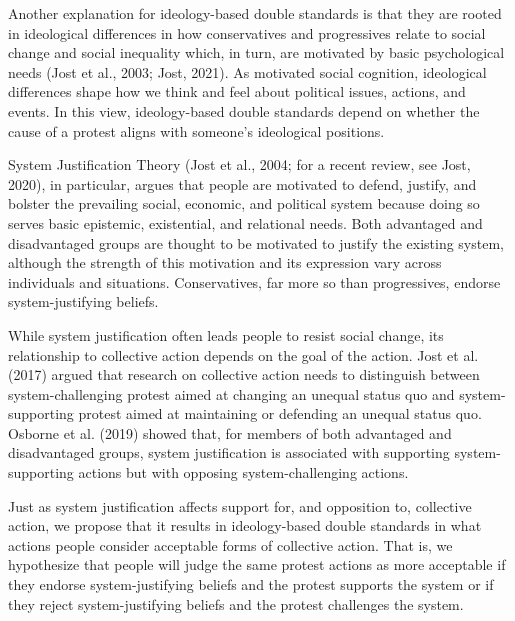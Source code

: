 \documentclass[12pt, letterpaper]{article}
\begin{document}
Another explanation for ideology-based double standards is that they are
rooted in ideological differences in how conservatives and progressives
relate to social change and social inequality which, in turn, are
motivated by basic psychological needs (Jost et al., 2003; Jost, 2021).
As motivated social cognition, ideological differences shape how we
think and feel about political issues, actions, and events. In this
view, ideology-based double standards depend on whether the cause of a
protest aligns with someone's ideological positions.

System Justification Theory (Jost et al., 2004; for a recent review, see
Jost, 2020), in particular, argues that people are motivated to defend,
justify, and bolster the prevailing social, economic, and political
system because doing so serves basic epistemic, existential, and
relational needs. Both advantaged and disadvantaged groups are thought
to be motivated to justify the existing system, although the strength of
this motivation and its expression vary across individuals and
situations. Conservatives, far more so than progressives, endorse
system-justifying beliefs.

While system justification often leads people to resist social change,
its relationship to collective action depends on the goal of the action.
Jost et al. (2017) argued that research on collective action needs to
distinguish between system-challenging protest aimed at changing an
unequal status quo and system-supporting protest aimed at maintaining or
defending an unequal status quo. Osborne et al. (2019) showed that, for
members of both advantaged and disadvantaged groups, system
justification is associated with supporting system-supporting actions
but with opposing system-challenging actions.

Just as system justification affects support for, and opposition to,
collective action, we propose that it results in ideology-based double
standards in what actions people consider acceptable forms of collective
action. That is, we hypothesize that people will judge the same protest
actions as more acceptable if they endorse system-justifying beliefs and
the protest supports the system or if they reject system-justifying
beliefs and the protest challenges the system.
\end{document}
